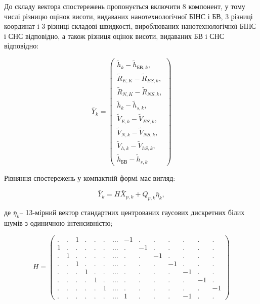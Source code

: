До 
складу вектора спостережень  пропонується включити 8 компонент, у тому числі різницю 
оцінок висоти, видаваних  нанотехнологічної БІНС   і БВ, 3 різниці координат і 3 
різниці складові швидкості, вироблюваних нанотехнологічної БІНС і СНС відповідно, 
а також різниця оцінок висоти, видаваних БВ і СНС відповідно:

\begin{equation} 
\label{eq:measure_vector} 
\bar{Y}_{k} = 
\left(\begin{array}{l}
{\tilde{h}_{k} -\tilde{h}_{\text{БВ},k},}\\
{\tilde{R}_{E,K} -\tilde{R}_{ES,k},}\\
{\tilde{R}_{N,K} -\tilde{R}_{NS,k},}\\
{\tilde{h}_{k} -\tilde{h}_{s,k},}\\
{\tilde{V}_{E,k} -\tilde{V}_{ES,k},}\\
{\tilde{V}_{N,k} -\tilde{V}_{NS,k},}\\
{\tilde{V}_{h,k} -\tilde{V}_{hS,k},}\\
{\tilde{h}_{\text{БВ}} -\tilde{h}_{s,k}}
\end{array} \right)  
\end{equation} 

Рівняння спостережень у компактній  формі має вигляд:

\[\bar{Y}_{k} =H\bar{X}_{p,k} +Q_{p,k} \bar{\eta }_{k} ,\] 

де $\bar{\eta }_{k} $-- 13-мірний вектор стандартних центрованих гаусових дискретних 
білих шумів з одиничною інтенсивністю;

\[H=\left(\begin{array}{cccccccccccccc}    
{.} & {.} & {1} & {.} & {.} & {.} & {\ldots } & {-1} & {.} & {.} & {.} & {.} & {.} & {.} \\ 
{1} & {.} & {.} & {.} & {.} & {.} & {\ldots } & {.} & {-1} & {.} & {.} & {.} & {.} & {.} \\ 
{.} & {1} & {.} & {.} & {.} & {.} & {\ldots } & {.} & {.} & {-1} & {.} & {.} & {.} & {.} \\ 
{.} & {.} & {1} & {.} & {.} & {.} & {\ldots } & {.} & {.} & {.} & {-1} & {.} & {.} & {.} \\ 
{.} & {.} & {.} & {1} & {.} & {.} & {\ldots } & {.} & {.} & {.} & {.} & {-1} & {.} & {.} \\ 
{.} & {.} & {.} & {.} & {1} & {.} & {\ldots } & {.} & {.} & {.} & {.} & {.} & {-1} & {.} \\ 
{.} & {.} & {.} & {.} & {.} & {1} & {\ldots } & {.} & {.} & {.} & {.} & {.} & {.} & {-1} \\ 
{.} & {.} & {.} & {.} & {.} & {.} & {\ldots } & {1} & {.} & {.} & {.} & {-1} & {.} & {.} 
\end{array}\right)\] 

